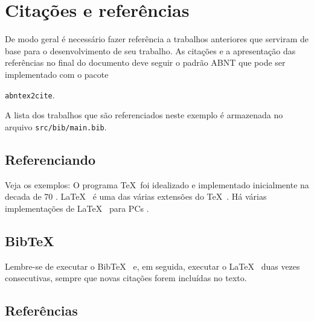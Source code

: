 
\chapter{Citações e referências}

De modo geral é necessário fazer referência a trabalhos anteriores
que serviram de base para o desenvolvimento de seu trabalho. As
citações e a apresentação das referências no final do
documento deve seguir o padrão ABNT que pode ser implementado com o pacote

\texttt{abntex2cite}.

\noindent A lista dos trabalhos que são referenciados neste
exemplo é armazenada no arquivo \newline\texttt{src/bib/main.bib}.

\section{Referenciando}

Veja os exemplos: O programa \TeX {}\ foi idealizado e implementado
inicialmente na decada de 70 \cite{knuth:tex}. \LaTeX {}\ \cite{lamport:latex}
é uma das várias extensões do \TeX \ \cite{knuth:tex}. Há
várias implementações de \LaTeX {}\ \cite{lamport:latex} para PCs
\cite{furuta:pctex}.

\section{BibTeX}

Lembre-se de executar o BibTeX\ \cite{patashnik:bibtex} e, em seguida, executar
o \LaTeX \ \cite{lamport:latex} duas vezes consecutivas, sempre que novas
citações forem incluídas no texto\cite{Saito}.

\section{Referências}
 \lipsum[1-3]
